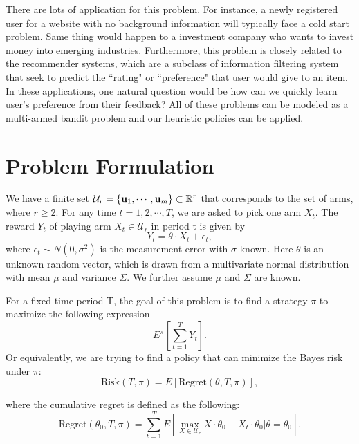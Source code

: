 \documentclass{article}
\theoremstyle{plain}
\theoremstyle{definition}
\begin{document}
There are lots of application for this problem. For instance, a newly registered user for a website with no background information will typically face a cold start problem. Same thing would happen to a investment company who wants to invest money into emerging industries. Furthermore, this problem is closely related to the recommender systems, which are a subclass of information filtering system that seek to predict the ``rating" or ``preference" that user would give to an item. In these applications, one natural question would be how can we quickly learn user's preference from their feedback? All of these problems can be modeled as a multi-armed bandit problem and our heuristic policies can be applied.





\section{Problem Formulation}
We have a finite set $\mathcal{U}_{r}=\{\bold{u}_{1},\cdots,\bold{u}_{m}\}\subset \mathbb{R}^{r}$ that corresponds to the set of arms, where $r\geq 2$. For any time $t=1,2,\cdots,T$, we are asked to pick one arm $X_{t}$. The reward $Y_{t}$ of playing arm $X_{t}\in \mathcal{U}_{r}$ in period t is given by
\begin{equation}
Y_{t} = \theta \cdot X_{t} + \epsilon_{t}, \nonumber
\end{equation}
where $\epsilon_{t}\sim N(0,\sigma^{2})$ is the measurement error with $\sigma$ known. Here $\theta$ is an unknown random vector, which is drawn from a multivariate normal distribution with mean $\mu$ and variance $\Sigma$. We further assume $\mu$ and $\Sigma$ are known.

For a fixed time period T, the goal of this problem is to find a strategy $\pi$ to maximize the following expression
\begin{equation}
E^{\pi}\left[\sum_{t=1}^{T} Y_{t}\right].
\end{equation}
Or equivalently, we are trying to find a policy that can minimize the Bayes risk under $\pi$:
\begin{equation}
\text{Risk}(T,\pi) = E\left[\text{Regret}(\theta,T,\pi)\right],
\end{equation}

where the cumulative regret is defined as the following:
\begin{equation}
\text{Regret}(\theta_{0},T,\pi)=\sum_{t=1}^{T}E\left[\max_{X\in \mathcal{U}_{r}}X\cdot\theta_{0}-X_{t}\cdot \theta_{0}|\theta=\theta_{0}\right].
\end{equation}
\end{document}
